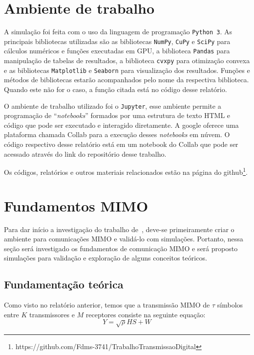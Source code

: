 \documentclass{article}
\begin{document}
\section{Ambiente de trabalho}
\label{sec:ambiente_trabalho}

A simulação foi feita com o uso da linguagem de programação \texttt{Python 3}. As principais bibliotecas utilizadas são as bibliotecas \texttt{NumPy}, \texttt{CuPy} e \texttt{SciPy} para cálculos numéricos e funções executadas em GPU, a biblioteca \texttt{Pandas} para manipulação de tabelas de resultados, a biblioteca \texttt{cvxpy} para otimização convexa e as bibliotecas \texttt{Matplotlib} e \texttt{Seaborn} para visualização dos resultados. Funções e métodos de bibliotecas estarão acompanhados pelo nome da respectiva biblioteca. Quando este não for o caso, a função citada está no código desse relatório. 

O ambiente de trabalho utilizado foi o \texttt{Jupyter}, esse ambiente permite a programação de ``\textit{notebooks}'' formados por uma estrutura de texto HTML e código que pode ser executado e interagido diretamente. A google oferece uma plataforma chamada Collab para a execução desses \textit{notebooks} em núvem. O código respectivo desse relatório está em um notebook do Collab que pode ser acessado através do link do repositório desse trabalho.

Os códigos, relatórios e outros materiais relacionados estão na página do github\footnote{https://github.com/Fdms-3741/TrabalhoTransmissaoDigital}.

\section{Fundamentos MIMO}
\label{sec:fundamentos_mimo}

Para dar início a investigação do trabalho de~\cite{li.etal_2017a}, deve-se primeiramente criar o ambiente para comunicações MIMO e validá-lo com simulações. Portanto, nessa seção será investigado os fundamentos de comunicação MIMO e será proposto simulações para validação e exploração de alguns conceitos teóricos.  

\subsection{Fundamentação teórica}

Como visto no relatório anterior, temos que a transmissão MIMO de $\tau$ símbolos entre $K$ transmissores e $M$ receptores consiste na seguinte equação:
\begin{equation}
    Y = \sqrt\rho HS + W
    \label{eq:transmissao_mimo}
\end{equation}
\end{document}
